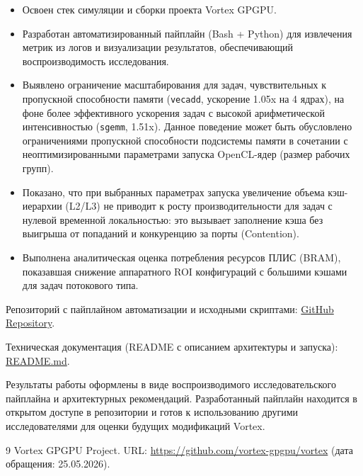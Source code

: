 \documentclass[a4paper]{article}
\begin{document}
\begin{itemize}
    \item Освоен стек симуляции и сборки проекта Vortex GPGPU.
    \item Разработан автоматизированный пайплайн (Bash + Python) для извлечения метрик из логов и визуализации результатов, обеспечивающий воспроизводимость исследования.
    \item Выявлено ограничение масштабирования для задач, чувствительных к пропускной способности памяти (\texttt{vecadd}, ускорение 1.05x на 4 ядрах), на фоне более эффективного ускорения задач с высокой арифметической интенсивностью (\texttt{sgemm}, 1.51x). Данное поведение может быть обусловлено ограничениями пропускной способности подсистемы памяти в сочетании с неоптимизированными параметрами запуска OpenCL-ядер (размер рабочих групп).
    \item Показано, что при выбранных параметрах запуска увеличение объема кэш-иерархии (L2/L3) не приводит к росту производительности для задач с нулевой временной локальностью: это вызывает заполнение кэша без выигрыша от попаданий и конкуренцию за порты (Contention).
    \item Выполнена аналитическая оценка потребления ресурсов ПЛИС (BRAM), показавшая снижение аппаратного ROI конфигураций с большими кэшами для задач потокового типа.
\end{itemize}

Репозиторий с пайплайном автоматизации и исходными скриптами: \href{https://github.com/Makuhin-Egor/Vortex-experiments-styding-practice}{GitHub Repository}.

Техническая документация (README с описанием архитектуры и запуска): \href{https://github.com/Makuhin-Egor/Vortex-experiments-styding-practice/blob/main/README.md}{README.md}.

Результаты работы оформлены в виде воспроизводимого исследовательского пайплайна и архитектурных рекомендаций. Разработанный пайплайн находится в открытом доступе в репозитории и готов к использованию другими исследователями для оценки будущих модификаций Vortex.

\begin{thebibliography}{9}
 Vortex GPGPU Project. URL: \url{https://github.com/vortex-gpgpu/vortex} (дата обращения: 25.05.2026).
\end{thebibliography}
\end{document}
